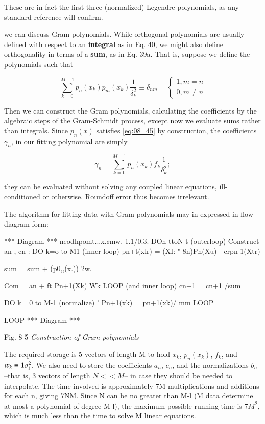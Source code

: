 These are in fact the first three (normalized) Legendre polynomials, as any standard reference will confirm.

 we can discuss Gram polynomials. While orthogonal polynomials are usually defined with respect to an \textbf{integral} as in Eq. 40, we might also define orthogonality in terms of a \textbf{sum}, as in Eq. 39a. That is, suppose we define the polynomials such that

\begin{equation}\label{eq:08_45}
\sum_{k=0}^{M-1}p_{n}(x_{k})p_{m}(x_{k})\frac{1}{\delta_{k}^{2}} \equiv \delta_{nm} =
    \begin{cases}
        1, m   = n \\
        0, m \ne n 
    \end{cases}
\end{equation}

Then we can construct the Gram polynomials, calculating the
coefficients by the algebraic steps of the Gram-Schmidt process, except now we evaluate sums rather than integrals. Since $p_{n}(x)$ satisfies \ref{eq:08_45} by construction, the coefficients $\gamma_{n}$, in our fitting polynomial are simply

\begin{equation}
\gamma_{n} = \sum_{k=0}^{M-1} p_{n}(x_{k})f_{k}\frac{1}{\delta_{k}^{2}} ;
\end{equation}

they can be evaluated without solving any coupled linear equations, ill-conditioned or otherwise. Roundoff error thus becomes irrelevant.

The algorithm for fitting data with Gram polynomials may in expressed in flow-diagram form:

*** Diagram ***
neodhpomt...x.¢mw. 1.1/0.3.
DOn-ttoN-t (outerloop)
Construct an , cn :
DO k=o to M1 (inner loop)
pn+t(xlr) = (XI: " 8n)Pn(Xu) - crpn-1(Xtr)

sum = sum + (p0,,(x.)) 2w.

Com = an + ft Pn+1(Xk) Wk
LOOP (and inner loop)
cn+1 = cn+1 /sum

DO k =0 to M-1 (normalize)
’ Pn+1(xk) = pn+1(xk)/ mm
LOOP

LOOP
*** Diagram ***

Fig. 8-5 \textit{Construction of Gram polynomials}

The required storage is 5 vectors of length M to hold $x_{k}$, $p_{n}(x_{k})$, $f_{k}$, and $w_{k} \equiv 1\/\sigma_{k}^{2}$. We also need to store the coefficients $a_{n}$, $c_{n}$, and the normalizations $b_{n}$ --that is, 3 vectors of length $N<<M$-- in case they should be needed to interpolate. The time involved is approximately 7M multiplications and additions for each n, giving 7NM. Since N can be no greater than M-l (M data determine at most a polynomial of degree M-l), the maximum possible running time is $7M^{2}$, which is much less than the time to solve M linear equations.

